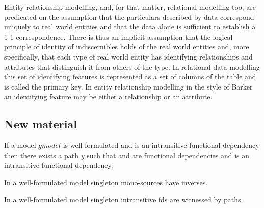 Entity relationship modelling, and, for that matter, relational modelling too, are predicated on the assumption that the particulars described by data correspond uniquely to real world entities and that the data alone is sufficient to establish a 1-1 correspondence. There is thus an implicit assumption that the logical principle of identity of indiscernibles holds of the real world entities and, more specifically, that each type of real world entity has identifying relationships and attributes that distinguish it from  others of the type. In relational data modelling this set of identifying features is represented as a set of columns of the table and is called the primary key. In entity relationship modelling in the style of Barker an identifying feature may be either a relationship or an attribute.   

\subsection{New material}
\begin{lemma}
If a model $gmodel$ is well-formulated and  is an intransitive functional dependency then there exists a path $y$
such that  and  are functional dependencies and  is an intransitive functional dependency.
\end{lemma}

\begin{oldtt}
\begin{lemma}
In a well-formulated model singleton mono-sources have inverses.
\end{lemma}

\begin{lemma}
In a well-formulated model singleton intransitive fds are witnessed by paths.
\end{lemma}
\end{oldtt}


